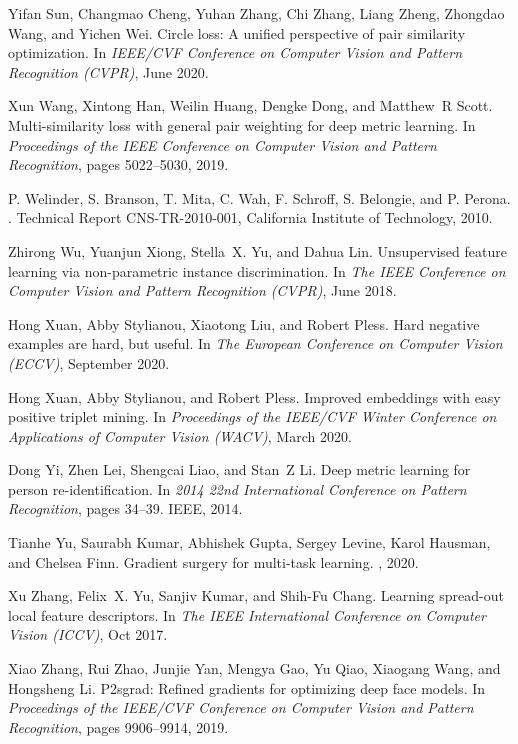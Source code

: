 \documentclass[10pt,twocolumn,letterpaper]{article}
\begin{document}
\begin{thebibliography}{10}
Yifan Sun, Changmao Cheng, Yuhan Zhang, Chi Zhang, Liang Zheng, Zhongdao Wang,
  and Yichen Wei.
\newblock Circle loss: A unified perspective of pair similarity optimization.
\newblock In {\em IEEE/CVF Conference on Computer Vision and Pattern
  Recognition (CVPR)}, June 2020.

Xun Wang, Xintong Han, Weilin Huang, Dengke Dong, and Matthew~R Scott.
\newblock Multi-similarity loss with general pair weighting for deep metric
  learning.
\newblock In {\em Proceedings of the IEEE Conference on Computer Vision and
  Pattern Recognition}, pages 5022--5030, 2019.

P. Welinder, S. Branson, T. Mita, C. Wah, F. Schroff, S. Belongie, and P.
  Perona.
.
\newblock Technical Report CNS-TR-2010-001, California Institute of Technology,
  2010.

Zhirong Wu, Yuanjun Xiong, Stella~X. Yu, and Dahua Lin.
\newblock Unsupervised feature learning via non-parametric instance
  discrimination.
\newblock In {\em The IEEE Conference on Computer Vision and Pattern
  Recognition (CVPR)}, June 2018.

Hong Xuan, Abby Stylianou, Xiaotong Liu, and Robert Pless.
\newblock Hard negative examples are hard, but useful.
\newblock In {\em The European Conference on Computer Vision (ECCV)}, September
  2020.

Hong Xuan, Abby Stylianou, and Robert Pless.
\newblock Improved embeddings with easy positive triplet mining.
\newblock In {\em Proceedings of the IEEE/CVF Winter Conference on Applications
  of Computer Vision (WACV)}, March 2020.

Dong Yi, Zhen Lei, Shengcai Liao, and Stan~Z Li.
\newblock Deep metric learning for person re-identification.
\newblock In {\em 2014 22nd International Conference on Pattern Recognition},
  pages 34--39. IEEE, 2014.

Tianhe Yu, Saurabh Kumar, Abhishek Gupta, Sergey Levine, Karol Hausman, and
  Chelsea Finn.
\newblock Gradient surgery for multi-task learning.
, 2020.

Xu Zhang, Felix~X. Yu, Sanjiv Kumar, and Shih-Fu Chang.
\newblock Learning spread-out local feature descriptors.
\newblock In {\em The IEEE International Conference on Computer Vision (ICCV)},
  Oct 2017.

Xiao Zhang, Rui Zhao, Junjie Yan, Mengya Gao, Yu Qiao, Xiaogang Wang, and
  Hongsheng Li.
\newblock P2sgrad: Refined gradients for optimizing deep face models.
\newblock In {\em Proceedings of the IEEE/CVF Conference on Computer Vision and
  Pattern Recognition}, pages 9906--9914, 2019.

\end{thebibliography}
 
\end{document}
